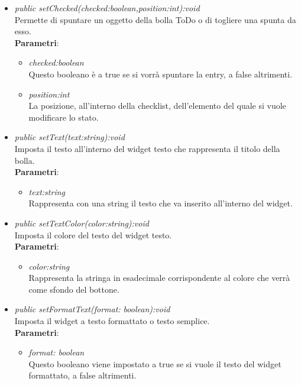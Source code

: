 \begin{itemize}
\begin{itemize}
\begin{itemize}
\begin{itemize}
		\end{itemize} 
\item \textit{public setChecked(checked:boolean,position:int):void}\\
	Permette di spuntare un oggetto della bolla ToDo o di togliere una spunta da esso.
		\\ \textbf{Parametri}: \begin{itemize}
		\item \textit{checked:boolean}\\
		Questo booleano è a true se si vorrà spuntare la entry, a false altrimenti.
		\item \textit{position:int}\\
		La posizione, all'interno della checklist, dell'elemento del quale si vuole modificare lo stato. 
		\end{itemize}
\item \textit{public setText(text:string):void}\\
	Imposta il testo all'interno del widget testo che rappresenta il titolo della bolla.
		\\ \textbf{Parametri}: \begin{itemize}
		\item \textit{text:string}\\
		Rappresenta con una string il testo che va inserito all'interno del widget.
		\end{itemize}
\item \textit{public setTextColor(color:string):void}\\
	Imposta il colore del testo del widget testo.
		\\ \textbf{Parametri}: \begin{itemize}
		\item \textit{color:string}\\
		Rappresenta la stringa in esadecimale corrispondente al colore che verrà come sfondo del bottone.
		\end{itemize}
\item \textit{public setFormatText(format: boolean):void}\\
	Imposta il widget a testo formattato o testo semplice.
		\\ \textbf{Parametri}: \begin{itemize}
		\item \textit{format: boolean}\\
		Questo booleano viene impostato a true se si vuole il testo del widget formattato, a false altrimenti.
		\end{itemize} 

\end{itemize}
\end{itemize}
\end{itemize}
